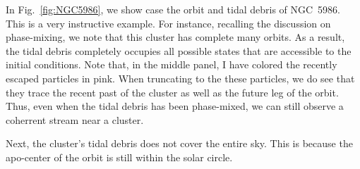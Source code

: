 In Fig.~\ref{fig:NGC5986}, we show case the orbit and tidal debris of NGC~5986. This is a very instructive example. For instance, recalling the discussion on phase-mixing, we note that this cluster has complete many orbits. As a result, the tidal debris completely occupies all possible states that are accessible to the initial conditions. Note that, in the middle panel, I have colored the recently escaped particles in pink. When truncating to the these particles, we do see that they trace the recent past of the cluster as well as the future leg of the orbit. Thus, even when the tidal debris has been phase-mixed, we can still observe a coherrent stream near a cluster. 

Next, the cluster's tidal debris does not cover the entire sky. This is because the apo-center of the orbit is still within the solar circle. 


